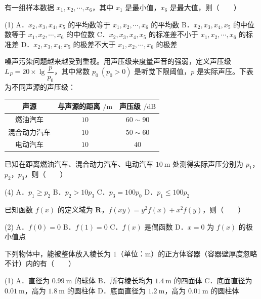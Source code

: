 \begin{question}
有一组样本数据 $x_1,x_2,\cdots,x_6$，其中 $x_1$ 是最小值，$x_6$ 是最大值，则\mbox{（　　）}

\begin{gkopts}(1)
\task A．$x_2,x_3,x_4,x_5$ 的平均数等于 $x_1,x_2,\cdots,x_6$ 的平均数
\task B．$x_2,x_3,x_4,x_5$ 的中位数等于 $x_1,x_2,\cdots,x_6$ 的中位数
\task C．$x_2,x_3,x_4,x_5$ 的标准差不小于 $x_1,x_2,\cdots,x_6$ 的标准差
\task D．$x_2,x_3,x_4,x_5$ 的极差不大于 $x_1,x_2,\cdots,x_6$ 的极差
\end{gkopts}

\end{question}
\begin{question}
噪声污染问题越来越受到重视。用声压级来度量声音的强弱，定义声压级 $L_P=20\times\lg\dfrac p{p_0}$，其中常数 $p_0\ (p_0>0)$ 是听觉下限阈值，$p$ 是实际声压。下表为不同声源的声压级：

\begin{center}
\begin{tabular}{ccc}
\toprule
声源 & 与声源的距离 $/\mathrm m$ & 声压级 $/\mathrm{dB}$ \\
\midrule
燃油汽车 & $10$ & $60\sim90$ \\
混合动力汽车 & $10$ & $50\sim60$ \\
电动汽车 & $10$ & $40$ \\
\bottomrule
\end{tabular}
\end{center}

已知在距离燃油汽车、混合动力汽车、电动汽车 $10\ \mathrm m$ 处测得实际声压分别为 $p_1$，$p_2$，$p_3$，则\mbox{（　　）}

\begin{gkopts}(4)
\task A．$p_1\ge p_2$
\task B．$p_2>10p_3$
\task C．$p_3=100p_0$
\task D．$p_1\le100p_2$
\end{gkopts}

\end{question}
\begin{question}
已知函数 $f(x)$ 的定义域为 $\mathbf R$，$f(xy)=y^{2}f(x)+x^{2}f(y)$，则\mbox{（　　）}

\begin{gkopts}(2)
\task A．$f(0)=0$
\task B．$f(1)=0$
\task C．$f(x)$ 是偶函数
\task D．$x=0$ 为 $f(x)$ 的极小值点
\end{gkopts}

\end{question}
\begin{question}
下列物体中，能被整体放入棱长为 $1$（单位：$\mathrm m$）的正方体容器（容器壁厚度忽略不计）内的有\mbox{（　　）}

\begin{gkopts}(1)
\task A．直径为 $0.99\ \mathrm m$ 的球体
\task B．所有棱长均为 $1.4\ \mathrm m$ 的四面体
\task C．底面直径为 $0.01\ \mathrm m$，高为 $1.8\ \mathrm m$ 的圆柱体
\task D．底面直径为 $1.2\ \mathrm m$，高为 $0.01\ \mathrm m$ 的圆柱体
\end{gkopts}

\par\medskip

\end{question}

